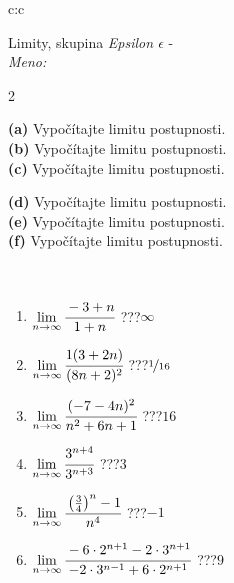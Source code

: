 \documentclass[10pt]{report}
\begin{document}
\newpage
\thispagestyle{empty}
\begin{tabular}{c:c}
\begin{minipage}[c][104.5mm][t]{0.5\linewidth}
\begin{center}
\vspace{5mm}
{\huge Limity, skupina \textit{Epsilon $\epsilon$} -}\\[5mm]
\textit{Meno:}\phantom{xxxxxxxxxxxxxxxxxxxxxxxxxxxxxxxxxxxxxxxxxxxxxxxxxxxxxxxxxxxxxxxxx}\\[5mm]
\begin{minipage}{0.95\linewidth}
\begin{center}
{\small \begin{multicols}{2} \raggedright
\textbf{(a)} Vypočítajte limitu postupnosti. \\[1mm]
\textbf{(b)} Vypočítajte limitu postupnosti. \\[1mm]
\textbf{(c)} Vypočítajte limitu postupnosti. \par \columnbreak
\textbf{(d)} Vypočítajte limitu postupnosti. \\[1mm]
\textbf{(e)} Vypočítajte limitu postupnosti. \\[1mm]
\textbf{(f)} Vypočítajte limitu postupnosti.
\end{multicols}
}
\end{center}
\end{minipage}
\\[1mm]
\begin{minipage}{0.79\linewidth}
\begin{center}
\begin{varwidth}{\linewidth}
\setlength{\itemsep}{0pt}
\begin{enumerate}
\footnotesizerr
\item $\lim\limits_{n\to\infty}\cfrac{-3+n}{1+n}$\quad \dotfill\; ???\;\dotfill \quad $\infty$
\item $\lim\limits_{n\to\infty}\cfrac{1(3+2n)}{(8n+2)^2}$\quad \dotfill\; ???\;\dotfill \quad $\nicefrac{1}{16}$
\item $\lim\limits_{n\to\infty}\cfrac{(-7-4n)^2}{n^2+6n+1}$\quad \dotfill\; ???\;\dotfill \quad $16$
\item $\lim\limits_{n\to\infty}\cfrac{3^{n+4}}{3^{n+3}}$\quad \dotfill\; ???\;\dotfill \quad $3$
\item $\lim\limits_{n\to\infty}\cfrac{\left(\frac{3}{4}\right)^n -1}{n^{4}}$\quad \dotfill\; ???\;\dotfill \quad $-1$
\item $\lim\limits_{n\to\infty}\cfrac{-6\cdot 2^{n+1}-2\cdot 3^{n+1}}{-2\cdot 3^{n-1}+6\cdot 2^{n+1}}$\quad \dotfill\; ???\;\dotfill \quad $9$

\end{enumerate}
\end{varwidth}
\end{center}
\end{minipage}
\end{center}
\end{minipage}
\end{tabular}
\end{document}
